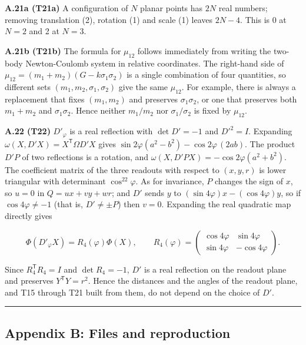 \documentclass[
  a4paper,
]{article}
\begin{document}
\textbf{A.21a (T21a)} A configuration of \(N\) planar points has \(2N\)
real numbers; removing translation (2), rotation (1) and scale (1)
leaves \(2N-4\). This is 0 at \(N=2\) and 2 at \(N=3\).

\textbf{A.21b (T21b)} The formula for \(\mu_{12}\) follows immediately
from writing the two-body Newton-Coulomb system in relative coordinates.
The right-hand side of \(\mu_{12}=(m_1+m_2)(G-k\sigma_1\sigma_2)\) is a
single combination of four quantities, so different sets
\((m_1,m_2,\sigma_1,\sigma_2)\) give the same \(\mu_{12}\). For example,
there is always a replacement that fixes \((m_1,m_2)\) and preserves
\(\sigma_1\sigma_2\), or one that preserves both \(m_1+m_2\) and
\(\sigma_1\sigma_2\). Hence neither \(m_1/m_2\) nor
\(\sigma_1/\sigma_2\) is fixed by \(\mu_{12}\).

\textbf{A.22 (T22)} \(D'_\varphi\) is a real reflection with
\(\det D'=-1\) and \(D'^2=I\). Expanding
\(\omega(X,D'X)=X^{\mathsf T}\Omega D'X\) gives
\(\sin2\varphi(a^2-b^2)-\cos2\varphi\,(2ab)\). The product \(D'P\) of
two reflections is a rotation, and
\(\omega(X,D'PX)=-\cos2\varphi(a^2+b^2)\). The coefficient matrix of the
three readouts with respect to \((x,y,r)\) is lower triangular with
determinant \(\cos^22\varphi\). As for invariance, \(P\) changes the
sign of \(x\), so \(u=0\) in \(Q=ux+vy+wr\); and \(D'\) sends \(y\) to
\((\sin4\varphi)x-(\cos4\varphi)y\), so if \(\cos4\varphi\neq-1\) (that
is, \(D'\neq\pm P\)) then \(v=0\). Expanding the real quadratic map
directly gives

\[
\Phi(D'_\varphi X)=R_4(\varphi)\Phi(X),\qquad
R_4(\varphi)=
\begin{pmatrix}
\cos4\varphi&\sin4\varphi\\
\sin4\varphi&-\cos4\varphi
\end{pmatrix}.
\]

Since \(R_4^{\mathsf T}R_4=I\) and \(\det R_4=-1\), \(D'\) is a real
reflection on the readout plane and preserves \(Y^{\mathsf T}Y=r^2\).
Hence the distances and the angles of the readout plane, and T15 through
T21 built from them, do not depend on the choice of \(D'\).

\begin{center}\rule{0.5\linewidth}{0.5pt}\end{center}

\subsection{Appendix B: Files and
reproduction}\label{appendix-b-files-and-reproduction}
\end{document}
